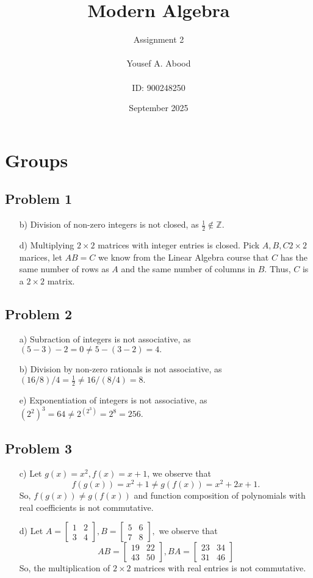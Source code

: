 \documentclass[a4paper,12pt]{article}
\title{Modern Algebra}
\author{Assignment 2\\ \\ Yousef A. Abood\\ \\ ID: 900248250}
\date{September 2025}
\begin{document}
\maketitle
\noindent\makebox[\linewidth]{\rule{15cm}{0.4pt}}
\section{Groups}
\subsection*{Problem 1}
\begin{itemize}
    \item [b)] Division of non-zero integers is not closed, as $\frac{1}{2} \notin \mathbb{Z}.$
    \item [d)] Multiplying $2 \times 2$ matrices with integer entries is closed. Pick $A,B,C 2\times 2$ marices, let $AB=C$ we know from the Linear Algebra course that $C$ has the same number of rows as $A$ and the same number of columns in $B$. Thus, $C$ is a $2 \times 2$ matrix.
\end{itemize}
\subsection*{Problem 2}
\begin{itemize}
    \item [a)] Subraction of integers is not associative, as $(5-3)-2=0\ne 5-(3-2)=4.$
    \item [b)] Division by non-zero rationals is not associative, as $(16/8)/4=\frac{1}{2}\ne 16/(8/4)=8.$
    \item [e)] Exponentiation of integers is not associative, as $(2^2)^3=64 \ne 2^{(2^3)}=2^8=256.$
\end{itemize}
\subsection*{Problem 3}
\begin{itemize}
    \item [c)] Let $g(x)=x^2, f(x)=x+1$, we observe that \[f(g(x))=x^2+1\ne g(f(x))=x^2+2x+1.\] So, $f(g(x))\ne g(f(x))$ and function composition of polynomials with real coefficients is not commutative.
    \item [d)] Let $A=\begin{bmatrix}
      1 & 2 \\
      3 & 4
    \end{bmatrix}, B=\begin{bmatrix}
      5 & 6 \\
      7 & 8
    \end{bmatrix},$ we observe that \[AB=\begin{bmatrix}
      19 & 22  \\
      43 & 50
    \end{bmatrix}, BA=\begin{bmatrix}
      23 & 34 \\
       31& 46
    \end{bmatrix}\] So, the multiplication of $2\times 2$ matrices with real entries is not commutative.
\end{itemize}
\end{document}
